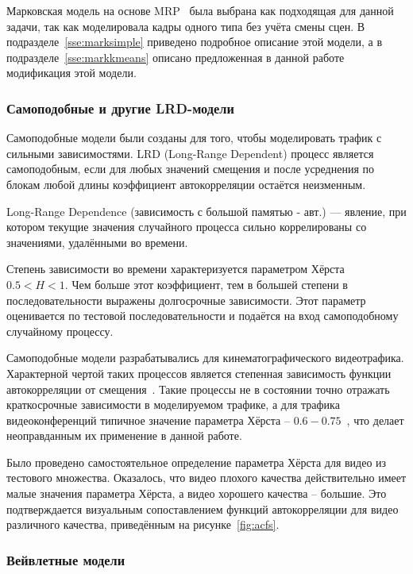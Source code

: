 Марковская модель на основе MRP~\cite{heymanATM} была
выбрана как подходящая для данной задачи, так как
моделировала кадры одного типа без учёта смены сцен.
В подразделе~\ref{sse:marksimple} приведено подробное
описание этой модели, а в подразделе~\ref{sse:markkmeans}
описано предложенная в данной работе модификация этой
модели.

\subsubsection{Самоподобные и другие LRD-модели}
\hspace{3pt}

Самоподобные модели были созданы для того, чтобы
моделировать трафик с сильными зависимостями.
LRD (Long-Range Dependent) процесс является самоподобным,
если для любых значений смещения и после усреднения по
блокам любой длины коэффициент автокорреляции остаётся
неизменным.

Long-Range Dependence (зависимость с большой памятью - авт.) ---
явление, при котором текущие значения случайного процесса
сильно коррелированы со значениями, удалёнными во времени.

Степень зависимости во времени характеризуется параметром
Хёрста $0.5 < H < 1$. Чем больше этот коэффициент, тем в большей
степени в последовательности выражены долгосрочные зависимости.
Этот параметр оценивается по тестовой
последовательности и подаётся на вход самоподобному случайному процессу.

Самоподобные модели разрабатывались для кинематографического видеотрафика.
Характерной чертой таких процессов является степенная зависимость
функции автокорреляции от смещения~\cite{selfsimilar}. Такие процессы
не в состоянии точно отражать краткосрочные зависимости
в моделируемом трафике, а для трафика видеоконференций типичное
значение параметра Хёрста -- $0.6-0.75$~\cite{raey}, что делает
неоправданным их применение в данной работе.

Было проведено самостоятельное определение параметра Хёрста для
видео из тестового множества. Оказалось, что видео плохого качества
действительно имеет малые значения параметра Хёрста, а видео хорошего
качества -- большие. Это подтверждается визуальным сопоставлением функций
автокорреляции для видео различного качества, приведённым на рисунке~\ref{fig:acfs}.

\subsubsection{Вейвлетные модели}
\hspace{3pt}

